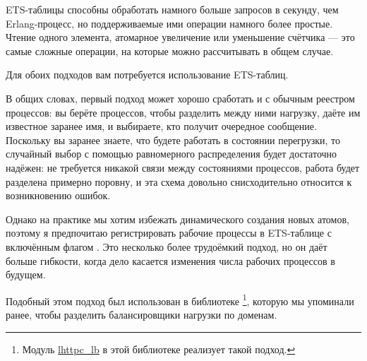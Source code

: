 \documentclass[11pt, oneside]{book}   	%
\begin{document}
ETS-таблицы способны обработать намного больше запросов в секунду, чем Erlang-процесс, но поддерживаемые ими операции намного более простые. Чтение одного элемента, атомарное увеличение или уменьшение счётчика --- это самые сложные операции, на которые можно рассчитывать в общем случае.

Для обоих подходов вам потребуется использование ETS-таблиц.

В общих словах, первый подход может хорошо сработать и с обычным реестром процессов: вы берёте  процессов, чтобы разделить между ними нагрузку, даёте им известное заранее имя, и выбираете, кто получит очередное сообщение. Поскольку вы заранее знаете, что будете работать в состоянии перегрузки, то случайный выбор с помощью равномерного распределения будет достаточно надёжен: не требуется никакой связи между состояниями процессов, работа будет разделена примерно поровну, и эта схема довольно снисходительно относится к возникновению ошибок.

Однако на практике мы хотим избежать динамического создания новых атомов, поэтому я предпочитаю регистрировать рабочие процессы в ETS-таблице с включённым флагом . Это несколько более трудоёмкий подход, но он даёт больше гибкости, когда дело касается изменения числа рабочих процессов в будущем.

Подобный этом подход был использован в библиотеке \footnote{Модуль \href{https://github.com/ferd/lhttpc/blob/master/src/lhttpc\_lb.erl}{lhttpc\_lb} в этой библиотеке реализует такой подход.}, которую мы упоминали ранее, чтобы разделить балансировщики нагрузки по доменам.
\end{document}

